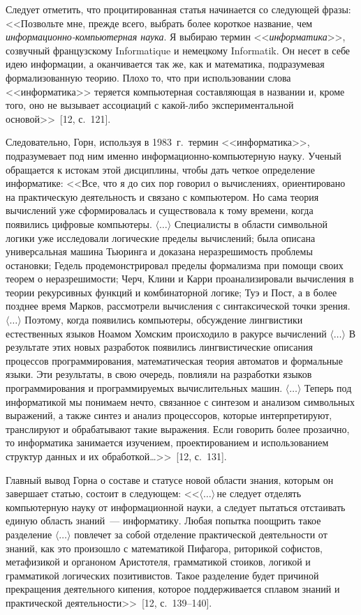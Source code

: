 \begin{multicols}{2}
      Следует отметить, что процитированная статья начинается со следующей фразы:
<<Позвольте мне, прежде всего, выбрать более короткое название, чем
      \textit{информационно-компьютерная наука}. Я выбираю термин
<<\textit{информатика}>>, созвучный французскому Informatique и немецкому Informatik. Он
несет в себе идею информации, а оканчивается так же, как и математика, подразумевая
формализованную теорию. Плохо то, что при использовании слова <<информатика>> теряется
компьютерная составляющая в названии и, кроме того, оно не вызывает ассоциаций с 
какой-либо экспериментальной основой>>~[12, с.~121].

      Следовательно, Горн, используя в 1983~г.\ термин <<информатика>>, подразумевает
под ним именно информационно-компьютерную науку. Ученый обращается к истокам этой
дисциплины, чтобы дать четкое определение информатике: <<Все, что я до сих пор говорил о
вычислениях, ориентировано на практическую деятельность и связано с компьютером. Но сама
теория вычислений уже сформировалась и существовала к тому времени, когда появились
цифровые компьютеры. $\langle\ldots\rangle$ Специалисты в области символьной логики уже
исследовали логические пределы вычислений; была описана универсальная машина Тьюринга
и доказана неразрешимость проблемы остановки; Гедель продемонстрировал пределы
формализма при помощи своих теорем о неразрешимости; Черч, Клини и Карри
проанализировали вычисления в теории рекурсивных функций и комбинаторной логике; Туэ и
Пост, а в более позднее время Марков, рас\-смот\-ре\-ли  вычисления с синтаксической точки
зрения. $\langle\ldots\rangle$ Поэтому, когда появились компьютеры, обсуждение лингвистики
естественных языков Ноамом Хомским происходило в ракурсе вычислений
$\langle\ldots\rangle$ В результате этих новых разработок появились лингвистические описания
процессов программирования, математическая теория автоматов и формальные языки. Эти
результаты, в свою очередь, повлияли на разработки языков программирования и
программируемых вычислительных машин.  $\langle\ldots\rangle$ Теперь под информатикой мы
понимаем нечто, связанное с синтезом и анализом символьных выражений, а также синтез и
анализ процессоров, которые интерпретируют, транслируют и обрабатывают такие выражения.
Если говорить более прозаично, то информатика занимается изучением, проектированием и
использованием структур данных и их обработкой\ldots >>~[12, с.~131].

      Главный вывод Горна о составе и статусе новой области знания, которым он завершает
\mbox{статью}, состоит в следующем: <<$\langle\ldots\rangle$\,не следует отделять компьютерную науку от информационной
науки, а следует пытаться отстаивать единую область знаний~--- информатику. Любая попытка
поощрить такое разделение $\langle\ldots\rangle$ повлечет за собой отделение практической
деятельности от знаний, как это произошло с математикой Пифагора, риторикой софистов,
метафизикой и органоном Аристотеля, грамматикой стоиков, логикой и грамматикой
логических позитивистов. Такое разделение будет причиной прекращения деятельного
кипения, которое поддерживается сплавом знаний и практической
деятельности>>~[12, с.~139--140].


\end{multicols}
